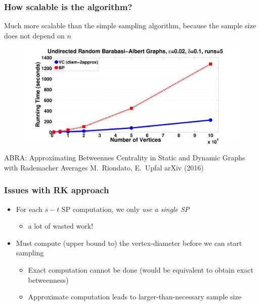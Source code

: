\begin{frame}
  \frametitle{How scalable is the algorithm?}
  Much more scalable than the simple sampling algorithm, because the sample
  size does not depend on $n$
  \vfill
  \begin{figure}[H]
    \centering
    \includegraphics[width=\textwidth]{imgs/random-time.pdf}
  \end{figure}
\end{frame}


\begin{frame}
  \centering
  \vfill
  {\huge ABRA: Approximating Betweennes Centrality in Static and Dynamic
  Graphs with Rademacher Averages}
  \vfill
  {\large M.~Riondato, E.~Upfal}
  \vfill
  {\large arXiv (2016)}
  \vfill
\end{frame}

\begin{frame}
  \frametitle{Issues with RK approach}
  \begin{itemize}
    \item For each $s-t$ SP computation, we only \emph{use a single SP}
      \begin{itemize}
        \item a lot of wasted work!
      \end{itemize}
      \pause
    \item Must compute (upper bound to) the vertex-diameter before we can start
      sampling
      \begin{itemize}
        \item Exact computation cannot be done (would be equivalent to obtain
          exact betweenness)
        \item Approximate computation leads to larger-than-necessary sample size
      \end{itemize}
      \pause
  \end{itemize}
\end{frame}

